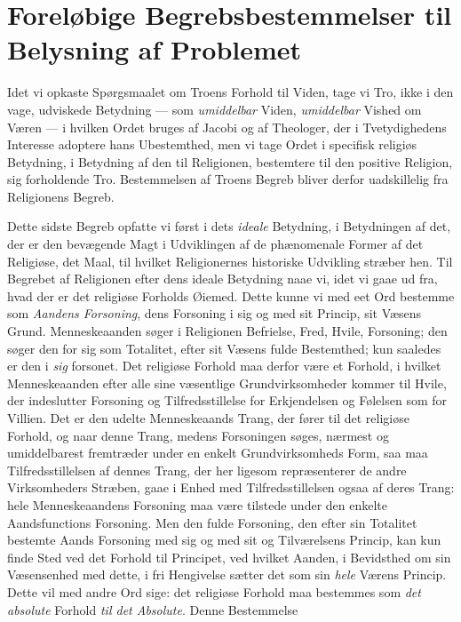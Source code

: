 \documentclass[12pt,a4paper]{book}
\newcommand{\opage}[1]{\marginnote{\footnotesize\textit{[#1]}}}
\begin{document}
\chapter{Foreløbige Begrebsbestemmelser til Belysning af Problemet}
\label{ch:begreber}

Idet vi opkaste Spørgsmaalet om Troens Forhold til Viden, tage vi Tro, ikke i
den vage, udviskede Betydning --- som \emph{umiddelbar} Viden, \emph{umiddelbar} Vished om
Væren --- i hvilken Ordet bruges af Jacobi og af Theologer, der i Tvetydighedens
Interesse adoptere hans Ubestemthed, men vi tage Ordet i specifisk religiøs
Betydning, \opage{32}i Betydning af den til Religionen, bestemtere til den positive
Religion, sig forholdende Tro. Bestemmelsen af Troens Begreb bliver derfor uadskillelig fra Religionens Begreb.

Dette sidste Begreb opfatte vi først i dets \emph{ideale} Betydning, i Betydningen af
det, der er den bevægende Magt i Udviklingen af de phænomenale Former af det
Religiøse, det Maal, til hvilket Religionernes historiske Udvikling stræber hen.
Til Begrebet af Religionen efter dens ideale Betydning naae vi, idet vi gaae ud
fra, hvad der er det religiøse Forholds Øiemed. Dette kunne vi med eet Ord
bestemme som \emph{Aandens Forsoning}, dens Forsoning i sig og med sit Princip, sit
Væsens Grund. Menneskeaanden søger i Religionen Befrielse, Fred, Hvile,
Forsoning; den søger den for sig som Totalitet, efter sit Væsens fulde
Bestemthed; kun saaledes er den i \emph{sig} forsonet. Det religiøse Forhold maa derfor
være et Forhold, i hvilket Menneskeaanden efter alle sine væsentlige
Grundvirksomheder kommer til Hvile, der indeslutter Forsoning og
Tilfredsstillelse for Erkjendelsen og Følelsen som for Villien. Det er den udelte
Menneskeaands Trang, der fører til det religiøse Forhold, og naar denne Trang,
medens Forsoningen søges, nærmest og umiddelbarest fremtræder under en enkelt
Grundvirksomheds Form, saa maa Tilfredsstillelsen af dennes Trang, der her
ligesom repræsenterer de andre Virksomheders Stræben, gaae i Enhed med
Tilfredsstillelsen ogsaa af deres Trang: hele Menneskeaandens Forsoning maa være
tilstede under den enkelte Aandsfunctions Forsoning. Men den fulde Forsoning, den
efter sin Totalitet bestemte Aands Forsoning med sig og med sit og Tilværelsens
Princip, kan kun finde Sted ved det Forhold til Principet, ved hvilket Aanden, i
Bevidsthed om sin Væsensenhed med dette, i fri Hengivelse sætter det som sin
\emph{hele} Værens Princip. Dette vil med andre Ord sige: det religiøse Forhold
maa bestemmes som \emph{det absolute} Forhold \emph{til det Absolute}. Denne Bestemmelse
\end{document}
